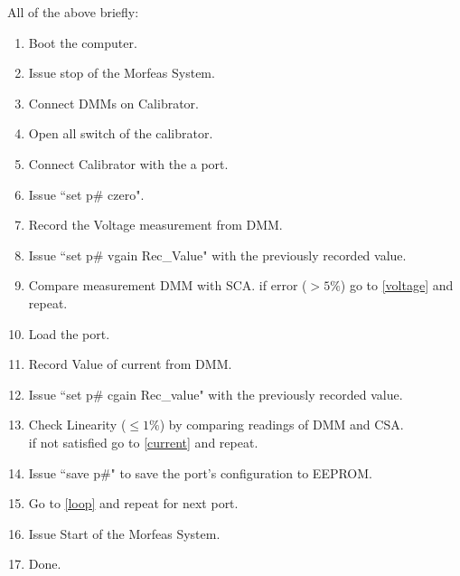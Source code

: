 All of the above briefly:
\begin{enumerate}
	\item Boot the computer.
	\item Issue stop of the Morfeas System.
	\item Connect DMMs on Calibrator.
	\item Open all switch of the calibrator.
	\item Connect Calibrator with the a port.\label{loop}
	\item Issue ``set p\# czero".
	\item Record the Voltage measurement from DMM.\label{voltage}
	\item Issue ``set p\# vgain Rec\_Value" with the previously recorded value.
	\item Compare measurement DMM with SCA. if error ($>5\%$) go to \ref{voltage} and repeat.
	\item Load the port.\label{current}
	\item Record Value of current from DMM.
	\item Issue ``set p\# cgain Rec\_value" with the previously recorded value.
	\item Check Linearity ($\leq1\%$) by comparing readings of DMM and CSA.\\ if not satisfied go to \ref{current} and repeat.
	\item Issue ``save p\#" to save the port's configuration to EEPROM.
	\item Go to \ref{loop} and repeat for next port.
	\item Issue Start of the Morfeas System.
	\item Done.
\end{enumerate}
